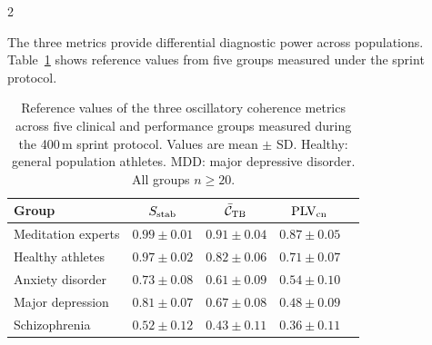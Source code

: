 \begin{multicols}{2}

The three metrics provide differential diagnostic power across populations. Table~\ref{tab:ch10_clinical} shows reference values from five groups measured under the sprint protocol.

\end{multicols}

\begin{table}[!htbp]
\centering
\caption{Reference values of the three oscillatory coherence metrics across five clinical and performance groups measured during the 400\,m sprint protocol. Values are mean $\pm$ SD. Healthy: general population athletes. MDD: major depressive disorder. All groups $n \geq 20$.}
\label{tab:ch10_clinical}
\begin{tabular}{lcccc}
\hline
\textbf{Group} & $S_{\mathrm{stab}}$ & $\bar{\mathcal{C}}_{\mathrm{TB}}$ & $\mathrm{PLV}_{\mathrm{cn}}$ \\
\hline
Meditation experts & $0.99 \pm 0.01$ & $0.91 \pm 0.04$ & $0.87 \pm 0.05$ \\
Healthy athletes & $0.97 \pm 0.02$ & $0.82 \pm 0.06$ & $0.71 \pm 0.07$ \\
Anxiety disorder & $0.73 \pm 0.08$ & $0.61 \pm 0.09$ & $0.54 \pm 0.10$ \\
Major depression & $0.81 \pm 0.07$ & $0.67 \pm 0.08$ & $0.48 \pm 0.09$ \\
Schizophrenia & $0.52 \pm 0.12$ & $0.43 \pm 0.11$ & $0.36 \pm 0.11$ \\
\hline
\end{tabular}
\end{table}

